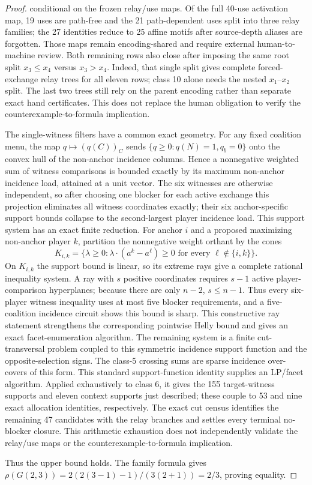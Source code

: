 \documentclass[11pt]{article}
\begin{document}
\begin{proof}
conditional on the frozen relay/use maps.  Of the full 40-use activation map,
19 uses are path-free and the 21 path-dependent uses split into three relay
families; the 27 identities reduce to 25 affine motifs after source-depth
aliases are forgotten.  Those maps remain encoding-shared and require
external human-to-machine review.
Both remaining rows also close after imposing the same root split
$x_3\le x_4$ versus $x_3>x_4$.  Indeed, that single split gives complete
forced-exchange relay trees for all eleven rows; class 10 alone needs the
nested $x_1$--$x_2$ split.  The last two trees still rely on the parent
encoding rather than separate exact hand certificates.  This does not replace
the human obligation to verify the counterexample-to-formula implication.

The single-witness filters have a common exact geometry.  For any fixed
coalition menu, the map $q\mapsto(q(C))_C$ sends
$\{q\geq0:q(N)=1,q_b=0\}$ onto the convex hull of the non-anchor incidence
columns.  Hence a nonnegative weighted sum of witness comparisons is bounded
exactly by its maximum non-anchor incidence load, attained at a unit vector.
The six witnesses are otherwise independent, so after choosing one blocker
for each active exchange this projection eliminates all witness coordinates
exactly; their six anchor-specific support bounds collapse to the
second-largest player incidence load.  This support system has an exact
finite reduction.  For anchor $i$ and a proposed maximizing non-anchor player
$k$, partition the nonnegative weight orthant by the cones
\[
 K_{i,k}=\{\lambda\geq0:
 \lambda\mathbin{\cdot}(a^k-a^\ell)\geq0
 \text{ for every }\ell\notin\{i,k\}\}.
\]
On $K_{i,k}$ the support bound is linear, so its extreme rays give a complete
rational inequality system.  A ray with $s$ positive coordinates requires
$s-1$ active player-comparison hyperplanes; because there are only $n-2$,
$s\leq n-1$.  Thus every six-player witness inequality uses at most five
blocker requirements, and a five-coalition incidence circuit shows this bound
is sharp.  This constructive ray statement strengthens the corresponding
pointwise Helly bound and gives an exact facet-enumeration algorithm.
The remaining system is a
finite cut-transversal problem coupled to this symmetric incidence support
function and the opposite-selection signs.  The class-5 crossing sums are
sparse incidence over-covers of this form.  This
standard support-function identity supplies an LP/facet algorithm.  Applied
exhaustively to class 6, it gives the 155 target-witness supports and eleven
context supports just described; these couple to 53 and nine exact allocation
identities, respectively.  The exact cut census identifies the remaining 47
candidates with the relay branches and settles every terminal no-blocker
closure.  This arithmetic exhaustion does not independently validate the
relay/use maps or the counterexample-to-formula implication.

Thus the upper bound holds.  The family formula gives
$\rho(G(2,3))=2(2(3-1)-1)/(3(2+1))=2/3$, proving equality.
\end{proof}
\end{document}
